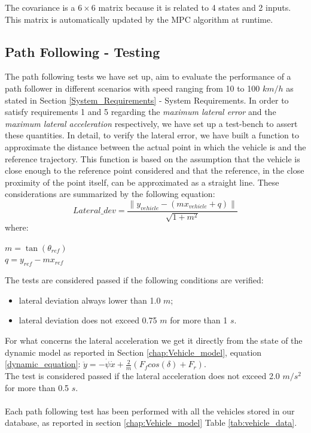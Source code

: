 The covariance is a $6\times 6$ matrix because it is related to 4 states and 2 inputs.\\
This matrix is automatically updated by the MPC algorithm at runtime.
\subsection{Path Following - Testing} \label{subsection:path_following_testing}
The path following tests we have set up, aim to evaluate the performance of a path follower in different scenarios with speed ranging from 10 to 100 $km/h$ as stated in Section \ref{System_Requirements} - System Requirements.
In order to satisfy requirements 1 and 5 regarding  the \textit{maximum lateral error} and the \textit{maximum lateral acceleration} respectively, we have set up a test-bench to assert these quantities. In detail, to verify the lateral error, we have built a function to approximate the distance between the actual point in which the vehicle is and the reference trajectory. This function is based on the assumption that the vehicle is close enough to the reference point considered and that the reference, in the close proximity of the point itself, can be approximated as a straight line. These considerations are summarized by the following equation:
\begin{equation}
    Lateral\_dev = \frac{\|y_{vehicle} - (mx_{vehicle} + q)\|}{\sqrt{1 + m^2}} \label{eq:lateral_dev}
\end{equation}
where:\\
\begin{center}
 $   m = \tan(\theta_{ref}) $\\ 
 $  q = y_{ref}-mx_{ref}$
\end{center}
\vspace{10pt}
The tests are considered passed if the following conditions are verified:
\begin{itemize}
    \item lateral deviation always lower than 1.0 $m$;
    \item lateral deviation does not exceed 0.75 $m$ for more than 1 $s$.
\end{itemize}
\vspace{10pt}
For what concerns the lateral acceleration we get it directly from the state of the dynamic model as reported in Section \ref{chap:Vehicle_model}, equation \ref{dynamic_equation}: $\ddot{y} = -\dot{\psi}\dot{x} + \frac{2}{m}\left(F_fcos(\delta) + F_r\right)$.\\
The test is considered passed if the lateral acceleration does not exceed 2.0 $m/s^2$ for more than 0.5 $s$.\\ \\
Each path following test has been performed with all the vehicles stored in our database, as reported in section \ref{chap:Vehicle_model} Table \ref{tab:vehicle_data}.

